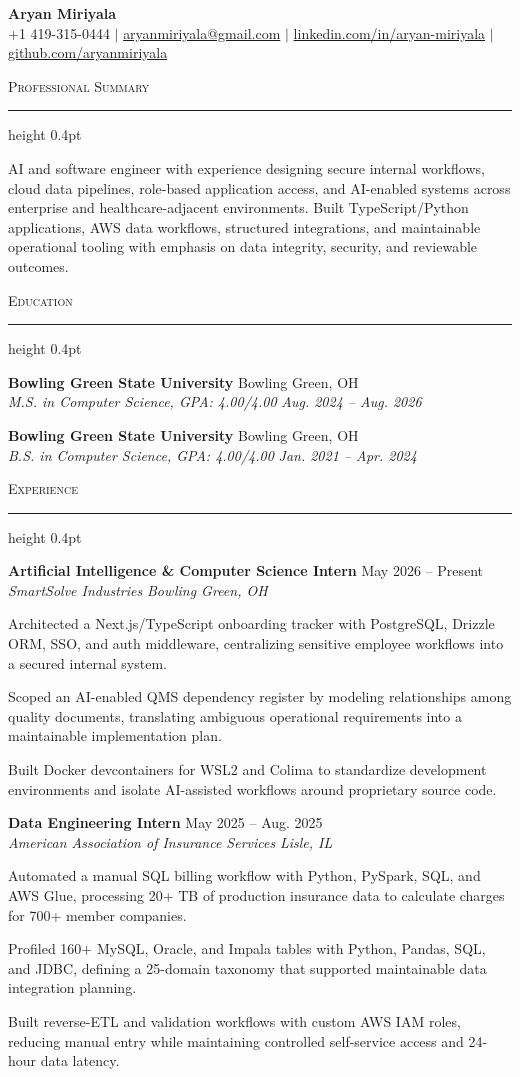 \documentclass[letterpaper,11pt]{article}
\newcommand{\resumesection}[1]{%
  \par\vspace{2pt}%
  {\large\scshape #1}\par\vspace{2pt}%
  \hrule height 0.4pt\vspace{2pt}%
}
\newcommand{\resumeSubheading}[4]{
  \textbf{#1} \hfill #2\\
  \textit{#3} \hfill \textit{#4}
}
\begin{document}
\begin{center}
  {\LARGE \textbf{Aryan Miriyala}}\\[-1pt]
  \small
  +1 419-315-0444 $|$
  \href{mailto:aryanmiriyala@gmail.com}{aryanmiriyala@gmail.com} $|$
  \href{https://www.linkedin.com/in/aryan-miriyala-7788a21b6/}{linkedin.com/in/aryan-miriyala} $|$
  \href{https://github.com/aryanmiriyala}{github.com/aryanmiriyala}
\end{center}\vspace{-10pt}

\resumesection{Professional Summary}
AI and software engineer with experience designing secure internal workflows, cloud data pipelines, role-based application access, and AI-enabled systems across enterprise and healthcare-adjacent environments. Built TypeScript/Python applications, AWS data workflows, structured integrations, and maintainable operational tooling with emphasis on data integrity, security, and reviewable outcomes.

\resumesection{Education}
\resumeSubheading
{Bowling Green State University}{Bowling Green, OH}
{M.S. in Computer Science, GPA: 4.00/4.00}{Aug. 2024 -- Aug. 2026}

\resumeSubheading
{Bowling Green State University}{Bowling Green, OH}
{B.S. in Computer Science, GPA: 4.00/4.00}{Jan. 2021 -- Apr. 2024}

\resumesection{Experience}
\resumeSubheading
{Artificial Intelligence \& Computer Science Intern}{May 2026 -- Present}
{SmartSolve Industries}{Bowling Green, OH}
\begin{tightitemize}
  \item Architected a Next.js/TypeScript onboarding tracker with PostgreSQL, Drizzle ORM, SSO, and auth middleware, centralizing sensitive employee workflows into a secured internal system.
  \item Scoped an AI-enabled QMS dependency register by modeling relationships among quality documents, translating ambiguous operational requirements into a maintainable implementation plan.
  \item Built Docker devcontainers for WSL2 and Colima to standardize development environments and isolate AI-assisted workflows around proprietary source code.
\end{tightitemize}

\resumeSubheading
{Data Engineering Intern}{May 2025 -- Aug. 2025}
{American Association of Insurance Services}{Lisle, IL}
\begin{tightitemize}
  \item Automated a manual SQL billing workflow with Python, PySpark, SQL, and AWS Glue, processing 20+ TB of production insurance data to calculate charges for 700+ member companies.
  \item Profiled 160+ MySQL, Oracle, and Impala tables with Python, Pandas, SQL, and JDBC, defining a 25-domain taxonomy that supported maintainable data integration planning.
  \item Built reverse-ETL and validation workflows with custom AWS IAM roles, reducing manual entry while maintaining controlled self-service access and 24-hour data latency.
\end{tightitemize}
\end{document}
